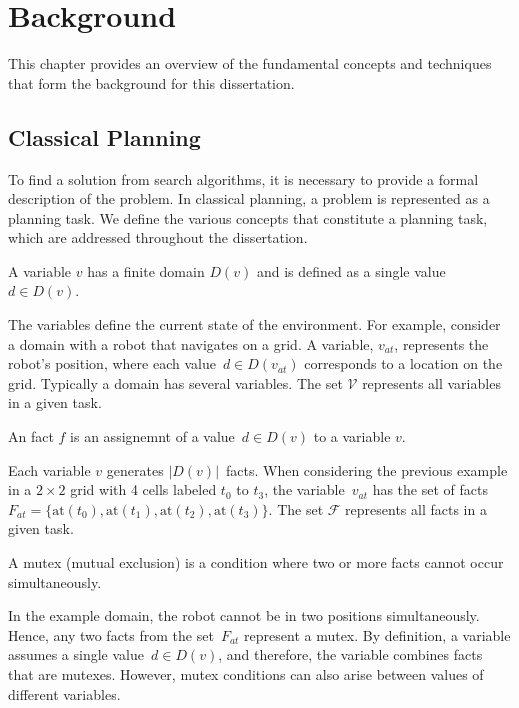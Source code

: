 \chapter{Background}
\label{sec:background}

This chapter provides an overview of the fundamental concepts and techniques that form the background for this dissertation.

\section{Classical Planning}
\label{sec:background_classicalplanning}

To find a solution from search algorithms, it is necessary to provide a formal description of the problem. In classical planning, a problem is represented as a planning task. We define the various concepts that constitute a planning task, which are addressed throughout the dissertation.

\begin{definition}[Variable]\label{def:variable}
    A variable $v$ has a finite domain $D(v)$ and is defined as a single value~$d \in D(v)$.
\end{definition}

The variables define the current state of the environment. For example, consider a domain with a robot that navigates on a grid. A variable, $v_{at}$, represents the robot's position, where each value~$d \in D(v_{at})$ corresponds to a location on the grid. Typically a domain has several variables. The set $\mathcal{V}$ represents all variables in a given task.

\begin{definition}[Fact]\label{def:fact}
    An fact $f$ is an assignemnt of a value~$d \in D(v)$ to a variable $v$.
\end{definition}

Each variable $v$ generates $|D(v)|$~facts. When considering the previous example in a $2 \times 2$ grid with 4 cells labeled $t_0$ to $t_3$, the variable~$v_{at}$ has the set of facts~$F_{at}=\{\text{at}(t_0),\text{at}(t_1),\text{at}(t_2),\text{at}(t_3)\}$. The set $\mathcal{F}$ represents all facts in a given task.

\begin{definition}[Mutex]\label{def:mutex}
    A mutex (mutual exclusion) is a condition where two or more facts cannot occur simultaneously.
\end{definition}

In the example domain, the robot cannot be in two positions simultaneously. Hence, any two facts from the set~$F_{at}$ represent a mutex. By definition, a variable assumes a single value~$d \in D(v)$, and therefore, the variable combines facts that are mutexes. However, mutex conditions can also arise between values of different variables.

